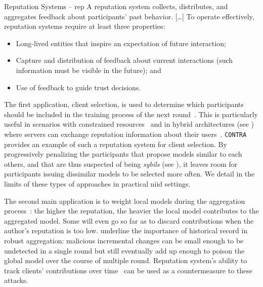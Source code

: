 \begin{definitionbox}{Reputation Systems -- \normalfont\textcite{resnick_Reputationsystems_2000}}{rep}
  A reputation system collects, distributes, and aggregates feedback about participants’ past behavior.
  [\dots]
  To operate effectively, reputation systems require at least three properties: 
  \begin{itemize}[\textbullet]
    \item Long-lived entities that inspire an expectation of future interaction;
    \item Capture and distribution of feedback about current interactions (such information must be visible in the future); and
    \item Use of feedback to guide trust decisions.
  \end{itemize}
\end{definitionbox}

The first application, client selection, is used to determine which participants should be included in the training process of the next round~\cite{kang_ReliableFederatedLearning_2020,awan_CONTRADefendingPoisoning_2021,song_ReputationBasedFederatedLearning_2022,tan_ReputationAwareFederatedLearning_2022}.
This is particularly useful in scenarios with constrained resources~\cite{song_ReputationBasedFederatedLearning_2022} and in hybrid architectures (see ) where servers can exchange reputation information about their users~\cite{kang_ReliableFederatedLearning_2020}.
\texttt{CONTRA}~\cite{awan_CONTRADefendingPoisoning_2021} provides an example of such a reputation system for client selection.
By progressively penalizing the participants that propose models similar to each others, and that are thus suspected of being \emph{sybils} (see ), it leaves room for participants issuing dissimilar models to be selected more often. 
We detail in  the limits of these types of approaches in practical \gls{niid} settings.  

The second main application is to weight local models during the aggregation process~\cite{wang_FLAREDefendingFederated_2022,wang_ReputationenabledFederatedLearning_2021}: the higher the reputation, the heavier the local model contributes to the aggregated model.
Some will even go so far as to discard contributions when the author's reputation is too low.
\textcite{karimireddy_LearningHistoryByzantine_2021} underline the importance of historical record in robust aggregation: malicious incremental changes can be small enough to be undetected in a single round but still eventually add up enough to poison the global model over the course of multiple round.
Reputation system's ability to track clients' contributions over time~\cite{kang_ReliableFederatedLearning_2020,wang_ReputationenabledFederatedLearning_2021} can be used as a countermeasure to these attacks.

